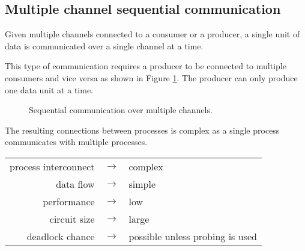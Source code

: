 \documentclass{report}
\begin{document}

\subsection{Multiple channel sequential communication}

Given multiple channels connected to a consumer or a producer, a single unit of
data is communicated over a single channel at a time.

This type of communication requires a producer to be connected to multiple
consumers and vice versa as shown in Figure
\ref{fig:multi-channel-communication}. The producer can only produce one data
unit at a time.

\begin {figure}[H]
\centering
{}
\caption {Sequential communication over multiple channels.}
\label {fig:multi-channel-communication}
\end {figure}

The resulting connections between processes is complex as a single process
communicates with multiple processes.

\begin{table}[H]
    \centering
    \begin{tabular}{ r c l }
        process interconnect & $\rightarrow$ & complex \\
        data flow            & $\rightarrow$ & simple \\
        performance          & $\rightarrow$ & low \\
        circuit size         & $\rightarrow$ & large \\
        deadlock chance      & $\rightarrow$ & possible unless probing is used \\
    \end{tabular}
\end{table}
\end{document}

